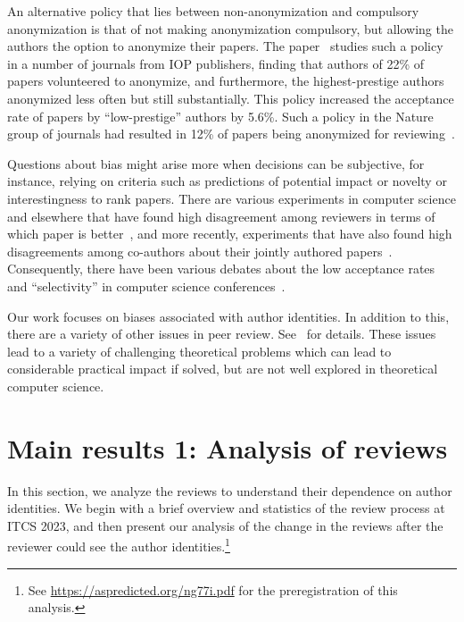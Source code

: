 \documentclass{article}
\newcommand{\rev}[1]{{\color{black}#1}}
\newcommand{\plosfootnote}[1]{\footnote{#1}}
\begin{document}
\rev{An alternative policy that lies between non-anonymization and compulsory anonymization is that of not making anonymization compulsory, but allowing the authors the option to anonymize their papers. The paper~\cite{Smirnova_Romero_Teplitskiy_2023} studies such a policy in a number of journals from IOP publishers, finding that authors of 22\% of papers volunteered to anonymize, and furthermore, the highest-prestige authors anonymized less often but still substantially. This policy increased the acceptance rate of papers by ``low-prestige'' authors by 5.6\%. Such a policy in the Nature group of journals had resulted in 12\% of papers being anonymized for reviewing~\cite{nature_anon_uptake_2017}.
}


Questions about bias might arise more when decisions can be subjective, for instance, relying on criteria such as predictions of potential impact or novelty or interestingness to rank papers. There are various experiments in computer science and elsewhere that have found high disagreement among reviewers in terms of which paper is better~\cite{obrecht2007examining, fogelholm2012panel,nips14experiment,pier2017your,beygelzimer2021neuripsconsistency}, and more recently, experiments that have also found high disagreements among co-authors about their jointly authored papers~\cite{rastogi2022authors}. Consequently, there have been various debates about the low acceptance rates and ``selectivity'' in computer science conferences~\cite{fortnow2009viewpoint,parhami2016low,vardi2017divination}. 

Our work focuses on biases associated with author identities. In addition to this, there are a variety of other issues in peer review. See~\cite{shah2022surveyextended} for details. These issues lead to a variety of challenging theoretical problems which can lead to considerable practical impact if solved, but are not well explored in theoretical computer science. 



\section{Main results 1: Analysis of reviews} 
In this section, we analyze the reviews to understand their dependence on author identities. We begin with a brief overview and statistics of the review process at ITCS 2023, and then present our analysis of the change in the reviews after the reviewer could see the author identities.\plosfootnote{See \url{https://aspredicted.org/ng77i.pdf} for the preregistration of this analysis.}
\end{document}
